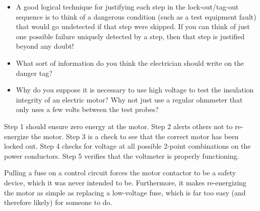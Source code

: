 \begin{itemize}
\item{} A good logical technique for justifying each step in the lock-out/tag-out sequence is to think of a dangerous condition (such as a test equipment fault) that would go undetected if that step were skipped.  If you can think of just one possible failure uniquely detected by a step, then that step is justified beyond any doubt!
\item{} What sort of information do you think the electrician should write on the danger tag?
\item{} Why do you suppose it is necessary to use high voltage to test the insulation integrity of an electric motor?  Why not just use a regular ohmmeter that only uses a few volts between the test probes?
\end{itemize}







Step 1 should ensure zero energy at the motor.  Step 2 alerts others not to re-energize the motor.  Step 3 is a check to see that the correct motor has been locked out.  Step 4 checks for voltage at all possible 2-point combinations on the power conductors.  Step 5 verifies that the voltmeter is properly functioning.

\vskip 10pt

Pulling a fuse on a control circuit forces the motor contactor to be a safety device, which it was never intended to be.  Furthermore, it makes re-energizing the motor as simple as replacing a low-voltage fuse, which is far too easy (and therefore likely) for someone to do.












